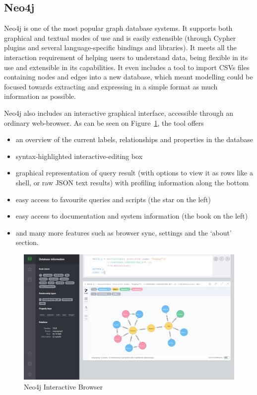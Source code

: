 \subsection{Neo4j}
\label{subsec:neo4jandtools}

Neo4j is one of the most popular graph database systems. It supports both
graphical and textual modes of use and is easily extensible (through Cypher
plugins and several language-specific bindings and libraries). It meets all the
interaction requirement of helping users to understand data, being flexible in
its use and extensible in its capabilities. It even includes a tool to import
CSVs files containing nodes and edges into a new database, which meant modelling
could be focused towards extracting and expressing in a simple format as much
information as possible.

Neo4j also includes an interactive graphical interface, accessible through an
ordinary web-browser. As can be seen on Figure~\ref{fig:neo4jbrowser}, the tool
offers 
\begin{itemize}
  \item an overview of the current labels, relationships and properties in the
        database
  \item syntax-highlighted interactive-editing box
  \item graphical representation of query result (with options to view it as
        rows like a shell, or raw JSON text results) with profiling information
        along the bottom
  \item easy access to favourite queries and scripts (the star on the left)
  \item easy access to documentation and system information (the book on the
        left)
  \item and many more features such as browser sync, settings and the `about'
        section.
\end{itemize}

\begin{figure}[tbp]

\includegraphics[width=\textwidth]{img/Neo4j_Browser.png}
\caption{Neo4j Interactive Browser}
\label{fig:neo4jbrowser}

\end{figure}

